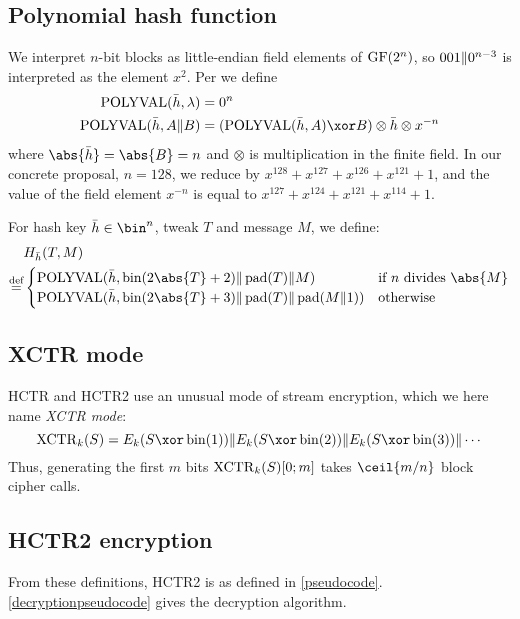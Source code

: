 \documentclass[hctr2.tex]{subfiles}
\begin{document}
\subsection{Polynomial hash function}\label{hashspec}
We interpret \(n\)-bit blocks as little-endian field elements of \(\operatorname{GF}(2^n)\),
so \(001 \Vert 0^{n-3}\) is interpreted as the element \(x^2\).
Per \cite{aes_gcm_siv,aes_gcm_siv_rfc} we define
\begin{align*}
    \POLYVAL(\hgen, \lambda) & = 0^n\\
    \POLYVAL(\hgen, A \Concat B) & = (\POLYVAL(\hgen, A) \xor B) \otimes \hgen \otimes x^{-n}
\end{align*}
where \(\abs{\hgen} = \abs{B} = n\) and
\(\otimes\) is multiplication in the finite field.
In our concrete proposal, \(n=128\), we reduce by
\(x^{128} + x^{127} + x^{126} + x^{121} + 1\),
and the value of the field element \(x^{-n}\)
is equal to \(x^{127} + x^{124} + x^{121} + x^{114} + 1\).

For hash key \(\hgen \in \bin^n\), tweak \(T\) and message \(M\), we define:
\begin{align*}
    & H_{\hgen}(T, M) \\
    \defeq & 
    \begin{cases}
        \POLYVAL(\hgen, \fromint(2\abs{T} + 2) \Concat \pad(T) \Concat M) &
        \text{if } n \text{ divides } \abs{M} \\
        \POLYVAL(\hgen, \fromint(2\abs{T} + 3) \Concat \pad(T) \Concat \pad(M \Concat 1)) &
        \text{otherwise}
    \end{cases}
\end{align*}

\subsection{XCTR mode}
HCTR and HCTR2 use an unusual mode of stream encryption,
which we here name \emph{XCTR mode}:
\begin{displaymath}
    \XCTR_k(S) = E_k(S \xor \fromint(1)) \Concat E_k(S \xor \fromint(2)) \Concat E_k(S \xor \fromint(3)) \Concat \cdots
\end{displaymath}
Thus, generating the first \(m\) bits \(\operatorname{XCTR}_k(S)[0; m]\) takes \(\ceil{m/n}\) block cipher calls. 

\subsection{HCTR2 encryption}
From these definitions, HCTR2 is as defined in \autoref{pseudocode}.
\autoref{decryptionpseudocode} gives the decryption algorithm.

\end{document}

